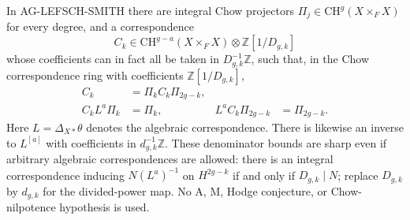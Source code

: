 \begin{proposition}
In AG-LEFSCH-SMITH there are integral Chow projectors
$\Pi_j\in\mathrm{CH}^{g}(X\times_F X)$ for every degree,
and a correspondence
\[
 C_k\in\mathrm{CH}^{g-a}(X\times_F X)
                   \otimes\mathbb Z[1/D_{g,k}]
\]
whose coefficients can in fact all be taken in
$D_{g,k}^{-1}\mathbb Z$, such that, in the Chow
correspondence ring with coefficients $\mathbb Z[1/D_{g,k}]$,
\begin{align*}
 C_k&=\Pi_k C_k\Pi_{2g-k},\\
 C_k L^a\Pi_k&=\Pi_k,&
 L^a C_k\Pi_{2g-k}&=\Pi_{2g-k}.
\end{align*}
Here $L=\Delta_{X*}\theta$ denotes the algebraic correspondence.
There is likewise an inverse to $L^{[a]}$ with coefficients
in $d_{g,k}^{-1}\mathbb Z$.  These denominator bounds are sharp
even if arbitrary algebraic correspondences are allowed:
there is an integral correspondence inducing
$N(L^a)^{-1}$ on $H^{2g-k}$ if and only if $D_{g,k}\mid N$;
replace $D_{g,k}$ by $d_{g,k}$ for the divided-power map.
No A, M, Hodge conjecture, or Chow-nilpotence hypothesis is used.
\end{proposition}
